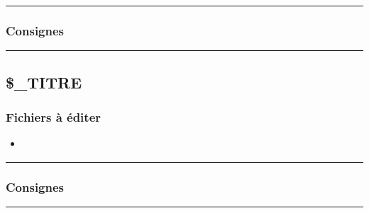 \documentclass[a4paper,10pt]{article}
\begin{document}

\color{blue}\par\noindent\rule{\textwidth}{0.4pt}\color{white}

\color{blue}
\subsubsection{Consignes}\color{white}




\color{green}\par\noindent\rule{\textwidth}{0.4pt}\color{white}

\color{green}
\subsection{\$\_TITRE}\color{white}

\color{blue}
\subsubsection{Fichiers à éditer}\color{white}

\begin{itemize}
    \item \textbf{\color{lime}\color{white}}
\end{itemize}



\color{blue}\par\noindent\rule{\textwidth}{0.4pt}\color{white}

\color{blue}
\subsubsection{Consignes}\color{white}




\color{green}\par\noindent\rule{\textwidth}{0.4pt}\color{white}
\end{document}
